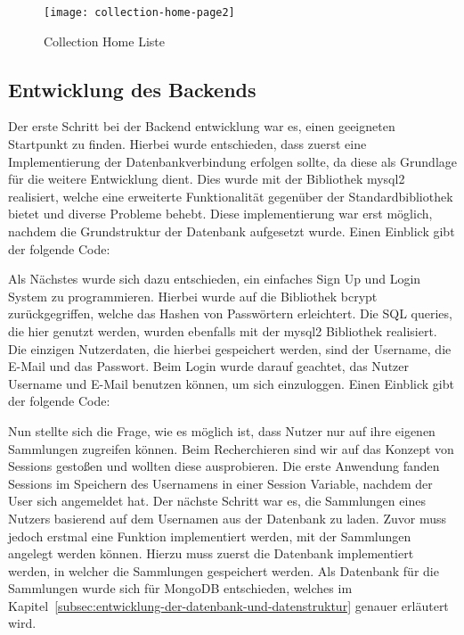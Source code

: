 \begin{figure}[h]
    \centering
    \texttt{[image: collection-home-page2]}
    \caption{Collection Home Liste}
    \label{fig:collection-home-page2}
\end{figure}

\subsection{Entwicklung des Backends}\label{subsec:EntwicklungDesBackends}
Der erste Schritt bei der Backend entwicklung war es, einen geeigneten Startpunkt zu finden.
Hierbei wurde entschieden, dass zuerst eine Implementierung der Datenbankverbindung erfolgen sollte, da diese als Grundlage für die weitere Entwicklung dient.
Dies wurde mit der Bibliothek mysql2 realisiert, welche eine erweiterte Funktionalität gegenüber der Standardbibliothek bietet und diverse Probleme behebt.
Diese implementierung war erst möglich, nachdem die Grundstruktur der Datenbank aufgesetzt wurde.
Einen Einblick gibt der folgende Code:
\vspace{1em}

\vspace{1em}
\newpage
Als Nächstes wurde sich dazu entschieden, ein einfaches Sign Up und Login System zu programmieren.
Hierbei wurde auf die Bibliothek bcrypt zurückgegriffen, welche das Hashen von Passwörtern erleichtert.
Die SQL queries, die hier genutzt werden, wurden ebenfalls mit der mysql2 Bibliothek realisiert.
Die einzigen Nutzerdaten, die hierbei gespeichert werden, sind der Username, die E-Mail und das Passwort.
Beim Login wurde darauf geachtet, das Nutzer Username und E-Mail benutzen können, um sich einzuloggen.
Einen Einblick gibt der folgende Code:
\vspace{1em}

\vspace{1em}
Nun stellte sich die Frage, wie es möglich ist, dass Nutzer nur auf ihre eigenen Sammlungen zugreifen können.
Beim Recherchieren sind wir auf das Konzept von Sessions gestoßen und wollten diese ausprobieren.
Die erste Anwendung fanden Sessions im Speichern des Usernamens in einer Session Variable, nachdem der User sich angemeldet hat.
Der nächste Schritt war es, die Sammlungen eines Nutzers basierend auf dem Usernamen aus der Datenbank zu laden.
Zuvor muss jedoch erstmal eine Funktion implementiert werden, mit der Sammlungen angelegt werden können.
Hierzu muss zuerst die Datenbank implementiert werden, in welcher die Sammlungen gespeichert werden.
Als Datenbank für die Sammlungen wurde sich für MongoDB entschieden, welches im Kapitel~\ref{subsec:entwicklung-der-datenbank-und-datenstruktur} genauer erläutert wird.

